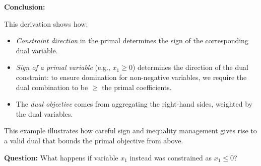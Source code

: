 \vspace{0.5em}
\textbf{Conclusion:}

This derivation shows how:
\begin{itemize}
  \item \emph{Constraint direction} in the primal determines the sign of the corresponding dual variable.
  \item \emph{Sign of a primal variable} (e.g., \( x_1 \geq 0 \)) determines the direction of the dual constraint: to ensure domination for non-negative variables, we require the dual combination to be \(\geq\) the primal coefficients.
  \item The \emph{dual objective} comes from aggregating the right-hand sides, weighted by the dual variables.
\end{itemize}
This example illustrates how careful sign and inequality management gives rise to a valid dual that bounds the primal objective from above.





\textbf{Question:} What happens if variable $x_1$ instead was constrained as $x_1 \leq 0$?



